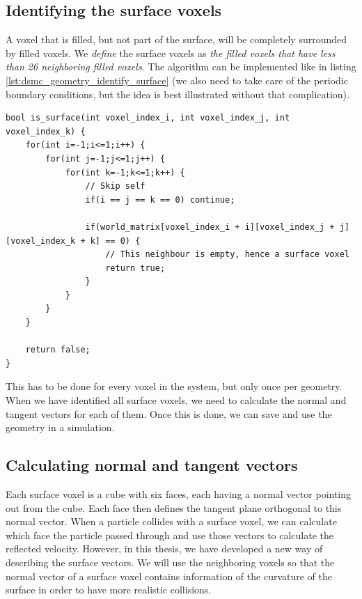 \subsection{Identifying the surface voxels}
A voxel that is filled, but not part of the surface, will be completely surrounded by filled voxels. We \textit{define} the surface voxels as \textit{the filled voxels that have less than 26 neighboring filled voxels}. The algorithm can be implemented like in listing \ref{lst:dsmc_geometry_identify_surface} (we also need to take care of the periodic boundary conditions, but the idea is best illustrated without that complication).
\begin{lstlisting}[caption=An example showing how to identify the surface voxels. The world\_matrix contains all the voxel values (zeros and ones)., label=lst:dsmc_geometry_identify_surface]
bool is_surface(int voxel_index_i, int voxel_index_j, int voxel_index_k) {
	for(int i=-1;i<=1;i++) {
    	for(int j=-1;j<=1;j++) {
			for(int k=-1;k<=1;k++) {
				// Skip self
				if(i == j == k == 0) continue; 

                if(world_matrix[voxel_index_i + i][voxel_index_j + j][voxel_index_k + k] == 0) {
                	// This neighbour is empty, hence a surface voxel
                	return true;
                }
            }
        }
    }

    return false;
}
\end{lstlisting}
This has to be done for every voxel in the system, but only once per geometry. When we have identified all surface voxels, we need to calculate the normal and tangent vectors for each of them. Once this is done, we can save and use the geometry in a simulation.
\subsection{Calculating normal and tangent vectors}
Each surface voxel is a cube with six faces, each having a normal vector pointing out from the cube. Each face then defines the tangent plane orthogonal to this normal vector. When a particle collides with a surface voxel, we can calculate which face the particle passed through and use those vectors to calculate the reflected velocity. However, in this thesis, we have developed a new way of describing the surface vectors. We will use the neighboring voxels so that the normal vector of a surface voxel contains information of the curvature of the surface in order to have more realistic collisions.

